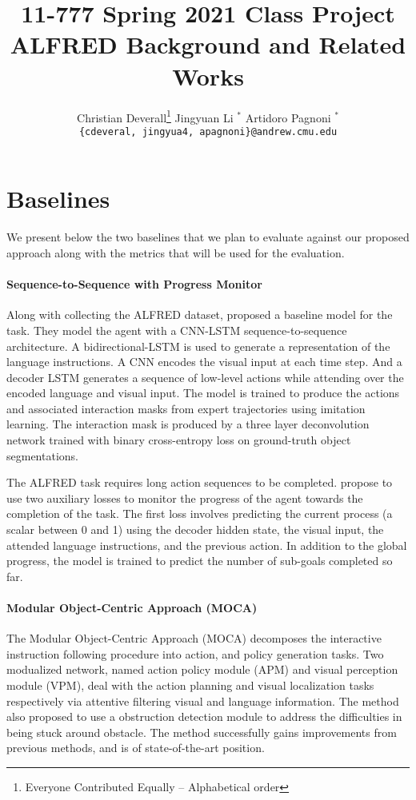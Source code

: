 \documentclass[11pt,a4paper]{article}
\title{11-777 Spring 2021 Class Project\\
ALFRED Background and Related Works}
\author{
  Christian Deverall\thanks{\hspace{4pt}Everyone Contributed Equally -- Alphabetical order} \hspace{2em} Jingyuan Li $^*$ \hspace{2em} Artidoro Pagnoni $^*$ \\
  \texttt{\{cdeveral, jingyua4, apagnoni\}@andrew.cmu.edu}
  }
\date{}
\begin{document}
\maketitle

\section{Baselines}
We present below the two baselines that we plan to evaluate against our proposed approach along with the metrics that will be used for the evaluation.

\paragraph{Sequence-to-Sequence with Progress Monitor}
Along with collecting the ALFRED dataset, \citet{ALFRED20} proposed a baseline model for the task. They model the agent with a CNN-LSTM sequence-to-sequence architecture. A bidirectional-LSTM is used to generate a representation of the language instructions. A CNN encodes the visual input at each time step. And a decoder LSTM generates a sequence of low-level actions while attending over the encoded language and visual input. The model is trained to produce the actions and associated interaction masks from expert trajectories using imitation learning. The interaction mask is produced by a three layer deconvolution network trained with binary cross-entropy loss on ground-truth object segmentations.

The ALFRED task requires long action sequences to be completed. \citet{ALFRED20} propose to use two auxiliary losses to monitor the progress of the agent towards the completion of the task. The first loss involves predicting the current process (a scalar between 0 and 1) using the decoder hidden state, the visual input, the attended language instructions, and the previous action. In addition to the global progress, the model is trained to predict the number of sub-goals completed so far. 

\paragraph{Modular Object-Centric Approach (MOCA)} The Modular Object-Centric Approach (MOCA) \citep{singh2020moca} decomposes the interactive instruction following procedure into action, and policy generation tasks. Two modualized network, named action policy module (APM) and visual perception module (VPM), deal with the action planning and visual localization tasks respectively via attentive filtering visual and language information. The method also proposed to use a obstruction detection module to address the difficulties in being stuck around obstacle. The method successfully gains improvements from previous methods, and is of state-of-the-art position.
\end{document}
